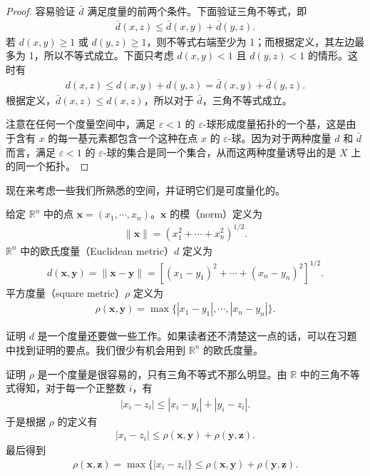 \documentclass[../../main.tex]{subfiles}
\begin{document}
\begin{proof}
容易验证 $\bar{d}$ 满足度量的前两个条件。下面验证三角不等式，即
\begin{align*}
\bar{d}(x, z) \leqslant \bar{d}(x, y) + \bar{d}(y, z).
\end{align*}
若 $d(x, y) \geqslant 1$ 或 $d(y, z) \geqslant 1$，则不等式右端至少为 1；而根据定义，其左边最多为 1，所以不等式成立。下面只考虑 $d(x, y) < 1$ 且 $d(y, z) < 1$ 的情形。这时有
\begin{align*}
d(x, z) \leqslant d(x, y) + d(y, z) = \bar{d}(x, y) + \bar{d}(y, z).
\end{align*}
根据定义，$\bar{d}(x, z) \leqslant d(x, z)$，所以对于 $\bar{d}$，三角不等式成立。

注意在任何一个度量空间中，满足 $\varepsilon < 1$ 的 $\varepsilon$-球形成度量拓扑的一个基，这是由于含有 $x$ 的每一基元素都包含一个这种在点 $x$ 的 $\varepsilon$-球。因为对于两种度量 $d$ 和 $\bar{d}$ 而言，满足 $\varepsilon < 1$ 的 $\varepsilon$-球的集合是同一个集合，从而这两种度量诱导出的是 $X$ 上的同一个拓扑。
\end{proof}

现在来考虑一些我们所熟悉的空间，并证明它们是可度量化的。

\begin{definition}[欧氏度量与平方度量]\label{definition:ch02-欧氏平方度量}
给定 $\mathbb{R}^{n}$ 中的点 $\boldsymbol{x} = (x_{1}, \cdots, x_{n})$。$\boldsymbol{x}$ 的模（norm）定义为
\begin{align*}
\|\boldsymbol{x}\| = (x_{1}^{2} + \cdots + x_{n}^{2})^{1/2}.
\end{align*}
$\mathbb{R}^{n}$ 中的欧氏度量（Euclidean metric）$d$ 定义为
\begin{align*}
d(\boldsymbol{x}, \boldsymbol{y}) = \|\boldsymbol{x} - \boldsymbol{y}\| = [(x_{1} - y_{1})^{2} + \cdots + (x_{n} - y_{n})^{2}]^{1/2}.
\end{align*}
平方度量（square metric）$\rho$ 定义为
\begin{align*}
\rho(\boldsymbol{x}, \boldsymbol{y}) = \max \{|x_{1} - y_{1}|, \cdots, |x_{n} - y_{n}|\}.
\end{align*}
\end{definition}

证明 $d$ 是一个度量还要做一些工作。如果读者还不清楚这一点的话，可以在习题中找到证明的要点。我们很少有机会用到 $\mathbb{R}^{n}$ 的欧氏度量。

证明 $\rho$ 是一个度量是很容易的，只有三角不等式不那么明显。由 $\mathbb{R}$ 中的三角不等式得知，对于每一个正整数 $i$，有
\begin{align*}
|x_{i} - z_{i}| \leqslant |x_{i} - y_{i}| + |y_{i} - z_{i}|.
\end{align*}
于是根据 $\rho$ 的定义有
\begin{align*}
|x_{i} - z_{i}| \leqslant \rho(\boldsymbol{x}, \boldsymbol{y}) + \rho(\boldsymbol{y}, \boldsymbol{z}).
\end{align*}
最后得到
\begin{align*}
\rho(\boldsymbol{x}, \boldsymbol{z}) = \max \{|x_{i} - z_{i}|\} \leqslant \rho(\boldsymbol{x}, \boldsymbol{y}) + \rho(\boldsymbol{y}, \boldsymbol{z}).
\end{align*}
\end{document}
